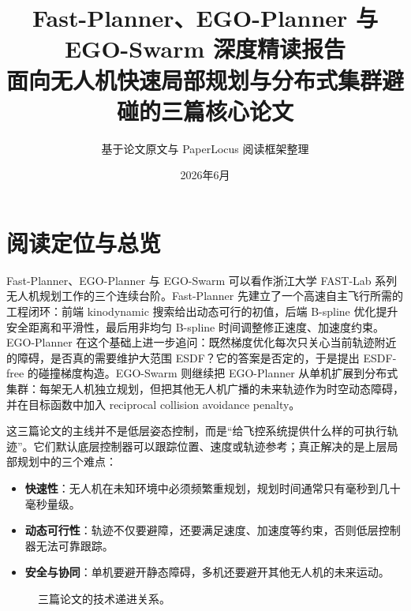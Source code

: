 \documentclass[UTF8,a4paper,12pt]{ctexart}
\title{\textbf{Fast-Planner、EGO-Planner 与 EGO-Swarm 深度精读报告}\\
\large 面向无人机快速局部规划与分布式集群避碰的三篇核心论文}
\author{基于论文原文与 PaperLocus 阅读框架整理}
\date{2026年6月}
\begin{document}
\maketitle
\tableofcontents
\newpage

\section{阅读定位与总览}

Fast-Planner、EGO-Planner 与 EGO-Swarm 可以看作浙江大学 FAST-Lab 系列无人机规划工作的三个连续台阶。Fast-Planner 先建立了一个高速自主飞行所需的工程闭环：前端 kinodynamic 搜索给出动态可行的初值，后端 B-spline 优化提升安全距离和平滑性，最后用非均匀 B-spline 时间调整修正速度、加速度约束。EGO-Planner 在这个基础上进一步追问：既然梯度优化每次只关心当前轨迹附近的障碍，是否真的需要维护大范围 ESDF？它的答案是否定的，于是提出 ESDF-free 的碰撞梯度构造。EGO-Swarm 则继续把 EGO-Planner 从单机扩展到分布式集群：每架无人机独立规划，但把其他无人机广播的未来轨迹作为时空动态障碍，并在目标函数中加入 reciprocal collision avoidance penalty。

这三篇论文的主线并不是低层姿态控制，而是“给飞控系统提供什么样的可执行轨迹”。它们默认底层控制器可以跟踪位置、速度或轨迹参考；真正解决的是上层局部规划中的三个难点：

\begin{itemize}
  \item \textbf{快速性}：无人机在未知环境中必须频繁重规划，规划时间通常只有毫秒到几十毫秒量级。
  \item \textbf{动态可行性}：轨迹不仅要避障，还要满足速度、加速度等约束，否则低层控制器无法可靠跟踪。
  \item \textbf{安全与协同}：单机要避开静态障碍，多机还要避开其他无人机的未来运动。
\end{itemize}

\begin{figure}[h]
\centering
{}
\caption{三篇论文的技术递进关系。}
\end{figure}
\end{document}
